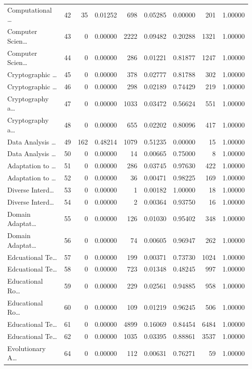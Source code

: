 \begin{table}
\begin{tabular}{lrrrrrrrr}
Computational … & 42 & 35 & 0.01252 & 698 & 0.05285 & 0.00000 & 201 & 1.00000 \\
Computer Scien… & 43 & 0 & 0.00000 & 2222 & 0.09482 & 0.20288 & 1321 & 1.00000 \\
Computer Scien… & 44 & 0 & 0.00000 & 286 & 0.01221 & 0.81877 & 1247 & 1.00000 \\
Cryptographic … & 45 & 0 & 0.00000 & 378 & 0.02777 & 0.81788 & 302 & 1.00000 \\
Cryptographic … & 46 & 0 & 0.00000 & 298 & 0.02189 & 0.74429 & 219 & 1.00000 \\
Cryptography a… & 47 & 0 & 0.00000 & 1033 & 0.03472 & 0.56624 & 551 & 1.00000 \\
Cryptography a… & 48 & 0 & 0.00000 & 655 & 0.02202 & 0.80096 & 417 & 1.00000 \\
Data Analysis … & 49 & 162 & 0.48214 & 1079 & 0.51235 & 0.00000 & 15 & 1.00000 \\
Data Analysis … & 50 & 0 & 0.00000 & 14 & 0.00665 & 0.75000 & 8 & 1.00000 \\
Adaptation to … & 51 & 0 & 0.00000 & 286 & 0.03745 & 0.97630 & 422 & 1.00000 \\
Adaptation to … & 52 & 0 & 0.00000 & 36 & 0.00471 & 0.98225 & 169 & 1.00000 \\
Diverse Interd… & 53 & 0 & 0.00000 & 1 & 0.00182 & 1.00000 & 18 & 1.00000 \\
Diverse Interd… & 54 & 0 & 0.00000 & 2 & 0.00364 & 0.93750 & 16 & 1.00000 \\
Domain Adaptat… & 55 & 0 & 0.00000 & 126 & 0.01030 & 0.95402 & 348 & 1.00000 \\
Domain Adaptat… & 56 & 0 & 0.00000 & 74 & 0.00605 & 0.96947 & 262 & 1.00000 \\
Edcuational Te… & 57 & 0 & 0.00000 & 199 & 0.00371 & 0.73730 & 1024 & 1.00000 \\
Edcuational Te… & 58 & 0 & 0.00000 & 723 & 0.01348 & 0.48245 & 997 & 1.00000 \\
Educational Ro… & 59 & 0 & 0.00000 & 229 & 0.02561 & 0.94885 & 958 & 1.00000 \\
Educational Ro… & 60 & 0 & 0.00000 & 109 & 0.01219 & 0.96245 & 506 & 1.00000 \\
Educational Te… & 61 & 0 & 0.00000 & 4899 & 0.16069 & 0.84454 & 6484 & 1.00000 \\
Educational Te… & 62 & 0 & 0.00000 & 1035 & 0.03395 & 0.88861 & 3537 & 1.00000 \\
Evolutionary A… & 64 & 0 & 0.00000 & 112 & 0.00631 & 0.76271 & 59 & 1.00000 \\

\end{tabular}
\end{table}
